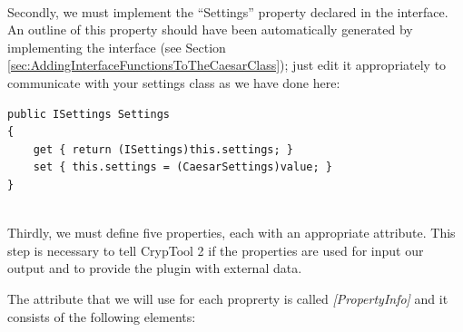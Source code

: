 \ \\
\indent Secondly, we must implement the ``Settings'' property declared in the interface. An outline of this property should have been automatically generated by implementing the interface (see Section \ref{sec:AddingInterfaceFunctionsToTheCaesarClass}); just edit it appropriately to communicate with your settings class as we have done here:

\begin{lstlisting}
public ISettings Settings
{
	get { return (ISettings)this.settings; }
	set { this.settings = (CaesarSettings)value; }
}
\end{lstlisting}

\ \\
\indent Thirdly, we must define five properties, each with an appropriate attribute. This step is necessary to tell CrypTool 2 if the properties are used for input our output and to provide the plugin with external data.

The attribute that we will use for each proprerty is called \textit{[PropertyInfo]} and it consists of the following elements:

